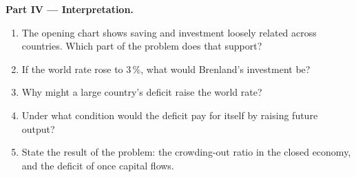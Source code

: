 \begin{problem}
\medskip
\noindent\textbf{Part IV --- Interpretation.}
\begin{enumerate}[resume]
\item The opening chart shows saving and investment loosely related across countries. Which part of the problem does that support?
\item If the world rate rose to 3\,\%, what would Brenland's investment be?
\item Why might a large country's deficit raise the world rate?
\item Under what condition would the deficit pay for itself by raising future output?
\item State the result of the problem: the crowding-out ratio in the closed economy, and the deficit of  once capital flows.
\end{enumerate}
\end{problem}
